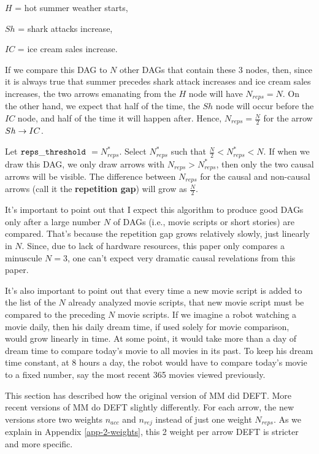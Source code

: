 \documentclass[12pt]{article}
\begin{document}
$H$ = hot summer weather starts,

$Sh$ = shark attacks increase, 

$IC$ = ice cream sales increase.

If we compare this DAG to $N$
other DAGs that contain these 3 nodes,
then, since it is always true
that summer precedes shark
attack increases and ice cream sales increases, the two arrows 
emanating
from the $H$ node 
will have $N_{reps} =N$.
On the other hand, we expect that half of the time, the $Sh$ node will occur before
the $IC$ node,
and half of the time it will happen after.
Hence, $N_{reps}=\frac{N}{2}$ for the
arrow $Sh\rightarrow IC$.

Let $\tt reps\_threshold$ $=N_{reps}^*$. Select $N_{reps}^*$ such that
$\frac{N}{2}< N_{reps}^* < N$. If when we draw this DAG, 
we only draw arrows with $N_{reps}> N_{reps}^*$, 
then only the two causal arrows will be visible. The difference  between
 $N_{reps}$ for the causal and non-causal
 arrows (call it the {\bf repetition gap})
  will grow 
   as $\frac{N}{2}$.
   
   
 It's important to point out
 that I expect this algorithm
 to produce good DAGs only
 after a large number $N$ of DAGs (i.e.,
 movie scripts or short stories)
 are compared. That's because the repetition gap
 grows relatively slowly, just linearly in $N$. Since,
 due to lack of hardware resources,
 this paper
 only compares a minuscule $N=3$,
 one can't expect very dramatic causal
 revelations from this paper.

It's also important to point out
that every time a new movie script is added to
the list of the $N$ already
analyzed movie scripts,
that new movie script must be compared to the
preceding $N$ movie scripts.
If we imagine a robot watching a movie daily,
then his daily dream time, if used solely
for movie comparison, 
would grow linearly in time.
At some point, it would take more than a day
of dream time to
compare today's movie to all movies in its past.
To keep his dream time constant, at 8 hours a day,
the robot
would have to compare today's movie
to a fixed number, say the most recent 365 movies 
viewed previously.

This section has described how the original version 
of MM did DEFT. More recent versions
of MM do DEFT slightly differently. For each arrow, the new versions store two weights $n_{acc}$
and $n_{rej}$ instead of just one weight $N_{reps}$.
As we explain in Appendix \ref{app-2-weights}, this
2 weight per arrow DEFT is stricter and more 
specific.
\end{document}
